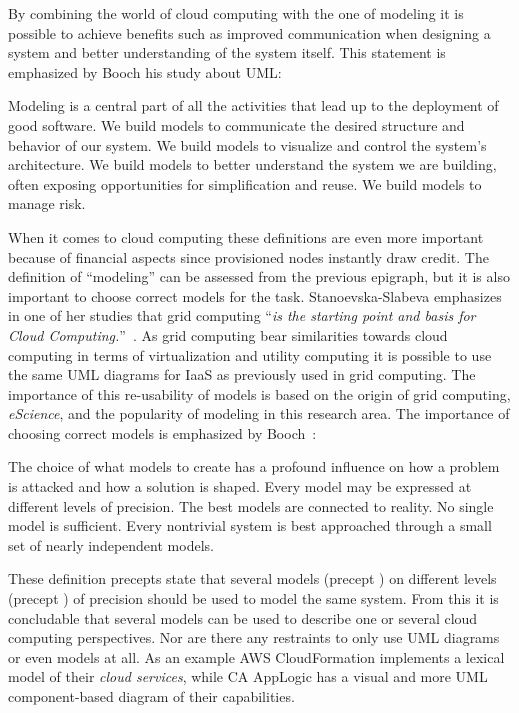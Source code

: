 By combining the world of cloud computing with the one of modeling 
it is possible to achieve benefits such as improved communication when designing 
a system and better understanding of the system itself.
This statement is emphasized by Booch \etal his study about UML:
\epigraph{
  Modeling is a central
  part of all the activities that lead up to the deployment of good
  software. We build models to communicate the desired structure and
  behavior of our system. We build models to visualize and control the
  system's architecture. We build models to better understand the
  system we are building, often exposing opportunities for
  simplification and reuse. We build models to manage risk.
}{}
When it comes to cloud computing these definitions are even more important
because of financial aspects since provisioned nodes instantly draw credit.
The definition of ``modeling'' can be assessed from the previous epigraph, but it is 
also important to choose correct models for the task.
Stanoevska-Slabeva emphasizes in one of her studies that grid computing
``\emph{is the starting point and basis for Cloud Computing.}''~\cite{introduction:wozniak10}.
As grid computing bear similarities towards cloud computing in terms of virtualization 
and utility computing
it is possible to use the same UML diagrams for IaaS as previously used in grid computing.
The importance of this re-usability of models is based on the origin of grid computing, 
\emph{eScience},
and the popularity of modeling in this research area.
The importance of choosing correct models is emphasized by Booch~\cite{unified:booch05}:
\epigraph{
  \begin{ii}\iitem The choice
  of what models to create has a profound influence on how a problem
  is attacked and how a solution is shaped. \iitem Every model may be
  expressed at different levels of precision. \iitem The best models
  are connected to reality. \iitem No single model is
  sufficient. Every nontrivial system is best approached through a
  small set of nearly independent models.\end{ii}
}{}
These definition precepts state that several models (precept ) on different levels (precept ) 
of precision should be used to model the same system.
From this it is concludable that several models can be used to describe one or several cloud computing perspectives.
Nor are there any restraints to only use UML diagrams or even models at all.
As an example AWS CloudFormation implements a lexical model of their \emph{cloud services},
while CA AppLogic has a visual and more UML component-based diagram of their capabilities.

